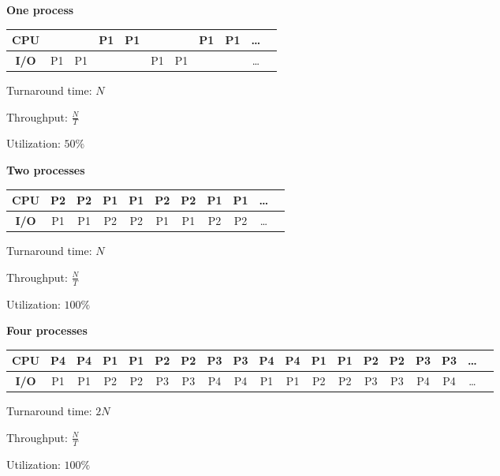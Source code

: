 \documentclass[11pt,largemargins]{homework}
\begin{document}
\begin{alphaparts}
\questionpart \textbf{One process}\\
    \begin{tabular}{|c|c|c|c|c|c|c|c|c|c|c|}\hline
        \textbf{CPU} &    &    & P1 & P1 &    &    & P1 & P1 & \ldots\\\hline
        \textbf{I/O} & P1 & P1 &    &    & P1 & P1 &    &    & \ldots\\\hline
    \end{tabular}
    
    Turnaround time: $N$

    Throughput: $\frac{N}{T}$

    Utilization: $50\%$

\questionpart \textbf{Two processes}\\
    \begin{tabular}{|c|c|c|c|c|c|c|c|c|c|c|}\hline
        \textbf{CPU} & P2 & P2 & P1 & P1 & P2 & P2 & P1 & P1 & \ldots\\\hline
        \textbf{I/O} & P1 & P1 & P2 & P2 & P1 & P1 & P2 & P2 & \ldots\\\hline
    \end{tabular}

    Turnaround time: $N$

    Throughput: $\frac{N}{T}$

    Utilization: $100\%$

\setlength{\tabcolsep}{2.3pt}
\questionpart \textbf{Four processes}\\
    \begin{tabular}{|c|c|c|c|c|c|c|c|c|c|c|c|c|c|c|c|c|c|c|}\hline
        \textbf{CPU} & P4 & P4 & P1 & P1 & P2 & P2 & P3 & P3 & P4 & P4 & P1 & P1 & P2 & P2 & P3 & P3 & \ldots\\\hline
        \textbf{I/O} & P1 & P1 & P2 & P2 & P3 & P3 & P4 & P4 & P1 & P1 & P2 & P2 & P3 & P3 & P4 & P4 & \ldots\\\hline
    \end{tabular}

    Turnaround time: $2N$

    Throughput: $\frac{N}{T}$

    Utilization: $100\%$
\end{alphaparts}

\clearpage
{}
\end{document}
